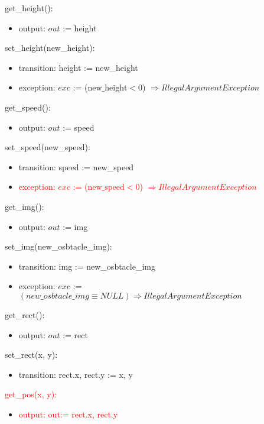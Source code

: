 \documentclass[12pt]{article}
\begin{document}
\noindent get\_height():
\begin{itemize}
    \item output: $out$ := height
\end{itemize}


\noindent set\_height(new\_height):
\begin{itemize}
    \item transition: height := new\_height
    \item exception: $exc$ := ($\text{new\_height} < 0$) $\Rightarrow  IllegalArgumentException$
\end{itemize}


\noindent get\_speed():
\begin{itemize}
    \item output: $out$ := speed
\end{itemize}


\noindent set\_speed(new\_speed):
\begin{itemize}
    \item transition: speed := new\_speed
    \item \textcolor{red}{exception: $exc$ := ($\text{new\_speed} < 0$) $\Rightarrow  IllegalArgumentException$}
\end{itemize}


\noindent get\_img():
\begin{itemize}
    \item output: $out$ := img 
\end{itemize}


\noindent set\_img(new\_osbtacle\_img):
\begin{itemize}
    \item transition: img := new\_osbtacle\_img
    \item exception: $exc$ := $(new\_osbtacle\_img \equiv NULL) \Rightarrow IllegalArgumentException $
\end{itemize}

\noindent get\_rect():
\begin{itemize}
    \item output: $out$ := rect 
\end{itemize}


\noindent set\_rect(x, y):
\begin{itemize}
    \item transition: rect.x, rect.y := x, y
\end{itemize}

\noindent \textcolor{red}{get\_pos(x, y):}
\begin{itemize}
    \item \textcolor{red}{output:  out:= rect.x, rect.y}
\end{itemize}
\end{document}
